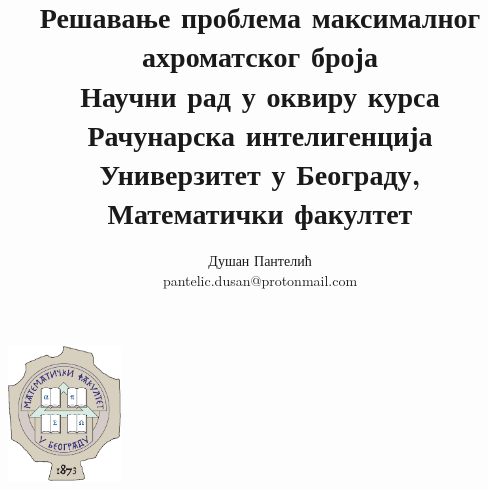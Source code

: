 \documentclass[a4paper]{article}
\begin{document}
\title{\Large Решавање проблема максималног ахроматског броја\\ \small{Научни рад у оквиру курса Рачунарска интелигенција\\ Универзитет у Београду, Математички факултет}}

\author{Душан Пантелић\\ pantelic.dusan@protonmail.com}

\maketitle

\begin{center}
	\includegraphics[width=3cm]{images/pmf.png}
\end{center}
\end{document}
